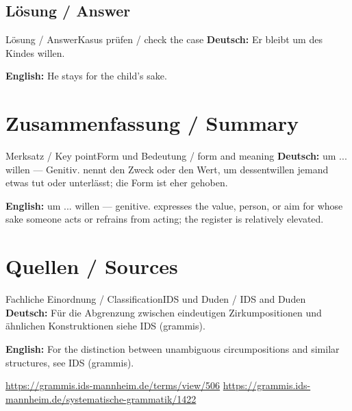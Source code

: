 \documentclass[a4paper,11pt]{article}
\newcommand{\GermanText}[1]{\textbf{Deutsch: }#1\par}
\newcommand{\EnglishText}[1]{{\small\color{SoftGray}\textbf{English: }#1\par}}
\begin{document}
\subsection{Lösung / Answer}
\begin{grammarentry}{Lösung / Answer}{Kasus prüfen / check the case}
\GermanText{Er bleibt um des Kindes willen.}
\EnglishText{He stays for the child's sake.}
\end{grammarentry}
\section{Zusammenfassung / Summary}
\begin{grammarentry}{Merksatz / Key point}{Form und Bedeutung / form and meaning}
\GermanText{um ... willen — Genitiv. nennt den Zweck oder den Wert, um dessentwillen jemand etwas tut oder unterlässt; die Form ist eher gehoben.}
\EnglishText{um ... willen — genitive. expresses the value, person, or aim for whose sake someone acts or refrains from acting; the register is relatively elevated.}
\end{grammarentry}
\section{Quellen / Sources}
\begin{grammarentry}{Fachliche Einordnung / Classification}{IDS und Duden / IDS and Duden}
\GermanText{Für die Abgrenzung zwischen eindeutigen Zirkumpositionen und ähnlichen Konstruktionen siehe IDS (grammis).}
\EnglishText{For the distinction between unambiguous circumpositions and similar structures, see IDS (grammis).}
\url{https://grammis.ids-mannheim.de/terms/view/506}
\url{https://grammis.ids-mannheim.de/systematische-grammatik/1422}
\end{grammarentry}
\end{document}
